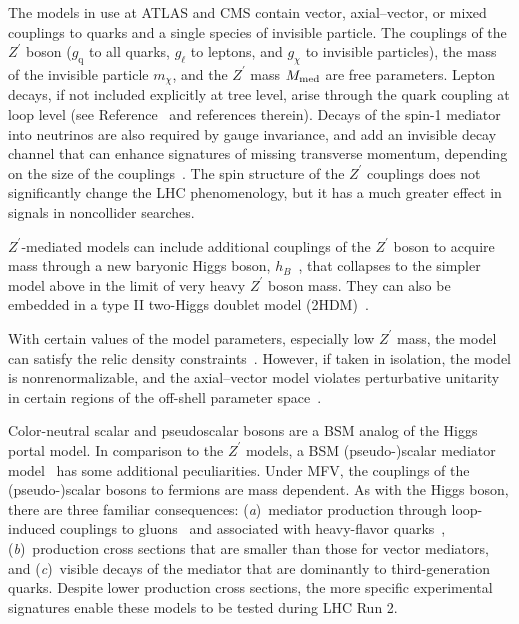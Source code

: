 \documentclass{ar-1col}
\newcommand{\chiDM}{\ensuremath{\chi}\xspace}
\newcommand{\IP}{invisible particle}
\newcommand{\mMed}{\ensuremath{M_{\rm{med}}}\xspace}
\newcommand{\mmed}{\mMed}
\newcommand{\gDM}{\ensuremath{g_{\chiDM}}\xspace}
\newcommand{\gl}{$g_{\ell}$\xspace}
\newcommand{\gq}{$g_{\mathrm{q}}$\xspace}
\newcommand{\mdm}{\ensuremath{m_{\chiDM}}\xspace}
\newcommand{\Zprime}{\ensuremath{{Z}^\prime}\xspace}
\begin{document}
The models in use at ATLAS and CMS contain vector,
axial--vector, or mixed couplings to quarks and a single species of
{\IP}. The couplings of the \Zprime boson (\gq to all quarks, \gl to
leptons, and \gDM to {\IP}s), the mass of the invisible particle \mdm, and the
\Zprime mass \mmed are free parameters. Lepton decays, if not
included explicitly at tree level, arise through the quark
coupling at loop level (see Reference~ and
references therein). Decays of the spin-1 mediator into neutrinos
are also required by gauge invariance, and add an invisible decay
channel that can enhance signatures of missing transverse
momentum, depending on the size of the
couplings~\cite{Albert:2017onk}. The spin structure of the \Zprime
couplings does not significantly change the LHC phenomenology, but it
has a much greater effect in signals in noncollider searches.

\Zprime-mediated models can include additional couplings of the
\Zprime boson to acquire mass through a new baryonic Higgs boson,
$h_B$~\cite{Berlin:2014cfa}, that collapses to the simpler model
above in the limit of very heavy \Zprime boson mass. They can also be
embedded in a type II two-Higgs doublet model
(2HDM)~\cite{Berlin:2014cfa}.

With certain values of the model parameters, especially low
\Zprime mass, the model can satisfy the relic density
constraints~\cite{Chala:2015ama}. However, if taken in isolation,
the model is nonrenormalizable, and the axial--vector model
violates perturbative unitarity in certain regions of the
off-shell parameter
space~\cite{Chala:2015ama,Kahlhoefer:2015bea,Boveia:2016mrp}.

{Color-neutral scalar and pseudoscalar bosons} are a BSM
analog of the Higgs portal model. In comparison to the \Zprime
models, a BSM (pseudo-)scalar mediator
model~\cite{Buckley:2014fba} has some additional peculiarities.
Under MFV, the couplings of the (pseudo-)scalar bosons to fermions
are mass dependent. As with the Higgs boson, there are three
familiar consequences: (\textit{a})\ mediator production through loop-induced
couplings to gluons~\cite{Haisch:2015ioa} and associated with
heavy-flavor quarks~\cite{Buckley:2014fba}, (\textit{b})\ production
cross sections that are smaller than those for vector mediators, and (\textit{c})\ visible
decays of the mediator that are dominantly to third-generation quarks.
Despite lower production cross sections, the more specific
experimental signatures enable these models to be tested during
LHC Run 2.
\end{document}
